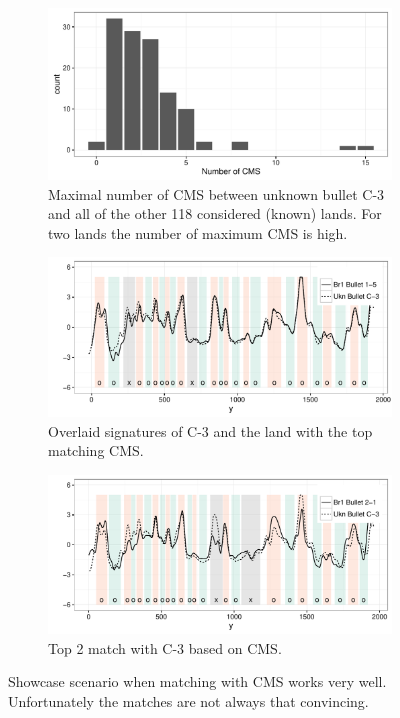 \documentclass[aoas, preprint]{imsart}\usepackage[]{graphicx}\usepackage[]{color}
\newenvironment{knitrout}{}{} %
\begin{document}
\begin{figure}[hbtp]
\begin{subfigure}[t]{\textwidth}\centering
\caption{Maximal number of CMS between unknown bullet C-3 and all of the other 118 considered (known) lands. For two lands the number of maximum CMS is high. }
\begin{knitrout}
\color{fgcolor}
\includegraphics[width=.5\textwidth]{cms-1} 

\end{knitrout}
\end{subfigure}
\begin{subfigure}[b]{.49\textwidth}\centering
\caption{Overlaid signatures of C-3 and the land with the top matching CMS.}
\begin{knitrout}
\color{fgcolor}
\includegraphics[width=\textwidth]{top-1} 

\end{knitrout}
\end{subfigure}
\begin{subfigure}[b]{.49\textwidth}\centering
\caption{Top 2 match with C-3 based on CMS.}
\begin{knitrout}
\color{fgcolor}
\includegraphics[width=\textwidth]{top2-1} 

\end{knitrout}
\end{subfigure}
\caption{\label{fig:hamby-perfect}Showcase scenario  when matching with CMS works very well. Unfortunately the matches are not always that convincing.}
\end{figure}
\end{document}
